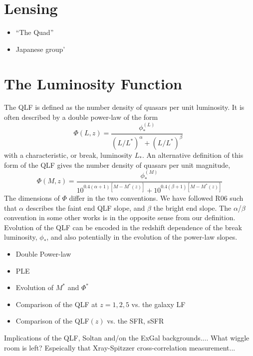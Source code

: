 \documentclass[usenatbib]{mn2e}
\begin{document}
\section{Lensing}  %
    \begin{itemize}
      \item{``The Quad''}
      \item{Japanese group'}
    \end{itemize}


\section{The Luminosity Function} %
The QLF is defined as the number density of quasars per unit
luminosity. It is often described by a double power-law
\citep[][hereafter, R06]{Boyle00,Croom04,Richards06} of the form
\begin{equation}
  \Phi(L, z) = \frac{ \phi_{*}^{(L)} }
                            {  (L/L^{*})^{\alpha}    +  (L/L^{*})^{\beta}  }
 \ \,
 \label{eq:double_powerlaw}
\end{equation}
with a characteristic, or break, luminosity $L_{*}$.  An alternative
definition of this form of the QLF gives the number density of quasars
per unit magnitude,
\begin{equation}
  \Phi(M, z) = \frac{ \phi_{*}^{(M)} }
       { 10^{0.4{(\alpha +1)[M-M^{*}(z)]}}+10^{0.4{(\beta +1)[M-M^{*}(z) ]}} }
 \label{eq:double_powerlaw_mag}
\end{equation}
The dimensions of $\Phi$ differ in the two conventions.  We have
followed R06 such that $\alpha$ describes the faint end QLF slope, and
$\beta$ the bright end slope.  The $\alpha$/$\beta$ convention in some
other works \citep[e.g.,][]{Croom09b} is in the opposite sense from our 
definition. Evolution of the QLF can be encoded in the redshift dependence 
of the break luminosity, $\phi_{*}$, and also potentially in the evolution of
the power-law slopes.

\begin{itemize}
  \item{Double Power-law}
  \item{PLE}
  \item{Evolution of $M^{*}$ and $\Phi^{*}$}
  \item{Comparison of the QLF at $z=1, 2, 5$ vs. the galaxy LF}
  \item{Comparison of the QLF$(z)$ vs. the SFR, sSFR}
\end{itemize}
Implications of the QLF, Soltan and/on the ExGal backgrounds....
What wiggle room is left? Espeically that Xray-Spitzzer cross-correlation measurement...
\end{document}
